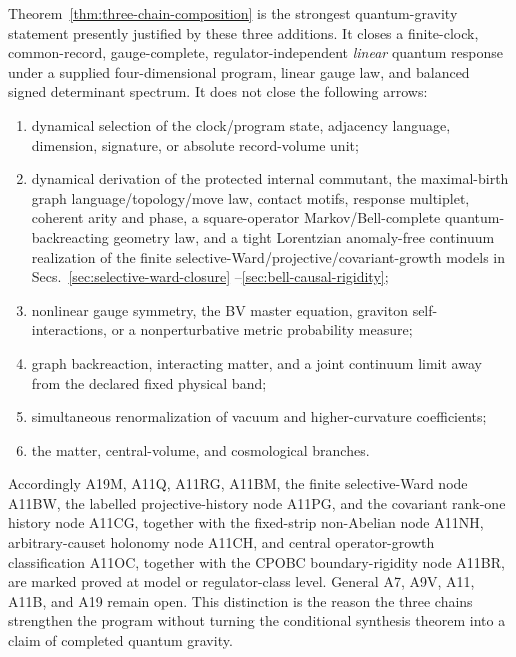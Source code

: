 Theorem~\ref{thm:three-chain-composition} is the strongest quantum-gravity
statement presently justified by these three additions.  It closes a
finite-clock, common-record, gauge-complete, regulator-independent
\emph{linear} quantum response under a supplied four-dimensional program,
linear gauge law, and balanced signed determinant spectrum.  It does not
close the following arrows:
\begin{enumerate}
\item dynamical selection of the clock/program state, adjacency language,
dimension, signature, or absolute record-volume unit;
\item dynamical derivation of the protected internal commutant, the
maximal-birth graph language/topology/move law, contact motifs, response
multiplet, coherent arity and phase, a square-operator
Markov/Bell-complete quantum-backreacting geometry law, and a tight
Lorentzian anomaly-free continuum realization of
the finite selective-Ward/projective/covariant-growth models in
Secs.~\ref{sec:selective-ward-closure}
--\ref{sec:bell-causal-rigidity};
\item nonlinear gauge symmetry, the BV master equation, graviton
self-interactions, or a nonperturbative metric probability measure;
\item graph backreaction, interacting matter, and a joint continuum limit
away from the declared fixed physical band;
\item simultaneous renormalization of vacuum and higher-curvature
coefficients;
\item the matter, central-volume, and cosmological branches.
\end{enumerate}
Accordingly A19M, A11Q, A11RG, A11BM, the finite selective-Ward node
A11BW, the labelled projective-history node A11PG, and the covariant
rank-one history node A11CG, together with the fixed-strip non-Abelian node
A11NH, arbitrary-causet holonomy node A11CH, and central operator-growth
classification A11OC, together with the CPOBC boundary-rigidity node A11BR,
are marked proved at model or regulator-class level.
General A7,
A9V, A11, A11B, and A19 remain open.  This distinction
is the reason the
three chains
strengthen the program without turning the conditional synthesis theorem
into a claim of completed quantum gravity.
